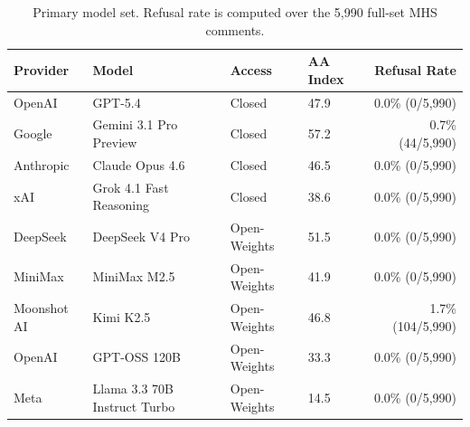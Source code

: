 \documentclass[11pt]{article}
\begin{document}
\begin{table}[t!]
\centering
\caption{Primary model set. Refusal rate is computed over the 5,990 full-set MHS comments.}
\label{tab:primary-models}
\begin{tabular}{llllr}
\toprule
Provider & Model & Access & AA Index & Refusal Rate \\
\midrule
OpenAI & GPT-5.4 & Closed & 47.9 & 0.0\% (0/5{,}990) \\
Google & Gemini 3.1 Pro Preview & Closed & 57.2 & 0.7\% (44/5{,}990) \\
Anthropic & Claude Opus 4.6 & Closed & 46.5 & 0.0\% (0/5{,}990) \\
xAI & Grok 4.1 Fast Reasoning & Closed & 38.6 & 0.0\% (0/5{,}990) \\
DeepSeek & DeepSeek V4 Pro & Open-Weights & 51.5 & 0.0\% (0/5{,}990) \\
MiniMax & MiniMax M2.5 & Open-Weights & 41.9 & 0.0\% (0/5{,}990) \\
Moonshot AI & Kimi K2.5 & Open-Weights & 46.8 & 1.7\% (104/5{,}990) \\
OpenAI & GPT-OSS 120B & Open-Weights & 33.3 & 0.0\% (0/5{,}990) \\
Meta & Llama 3.3 70B Instruct Turbo & Open-Weights & 14.5 & 0.0\% (0/5{,}990) \\
\bottomrule
\end{tabular}
\end{table}
\end{document}
